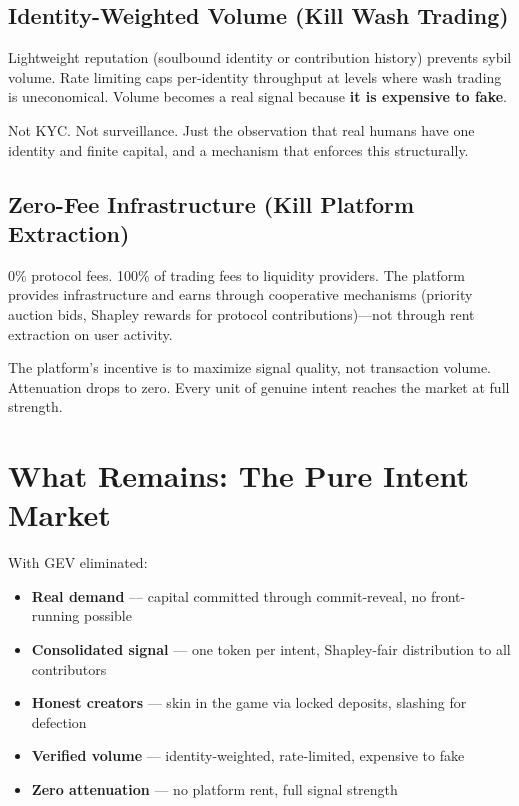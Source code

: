 \documentclass[9pt, letterpaper]{article}
\begin{document}
\subsection{Identity-Weighted Volume (Kill Wash Trading)}

Lightweight reputation (soulbound identity or contribution history) prevents sybil volume. Rate limiting caps per-identity throughput at levels where wash trading is uneconomical. Volume becomes a real signal because \textbf{it is expensive to fake}.

Not KYC. Not surveillance. Just the observation that real humans have one identity and finite capital, and a mechanism that enforces this structurally.

\subsection{Zero-Fee Infrastructure (Kill Platform Extraction)}

0\% protocol fees. 100\% of trading fees to liquidity providers. The platform provides infrastructure and earns through cooperative mechanisms (priority auction bids, Shapley rewards for protocol contributions)---not through rent extraction on user activity.

The platform's incentive is to maximize signal quality, not transaction volume. Attenuation drops to zero. Every unit of genuine intent reaches the market at full strength.


\section{What Remains: The Pure Intent Market}

With GEV eliminated:

\begin{itemize}
\item \textbf{Real demand} --- capital committed through commit-reveal, no front-running possible
\item \textbf{Consolidated signal} --- one token per intent, Shapley-fair distribution to all contributors
\item \textbf{Honest creators} --- skin in the game via locked deposits, slashing for defection
\item \textbf{Verified volume} --- identity-weighted, rate-limited, expensive to fake
\item \textbf{Zero attenuation} --- no platform rent, full signal strength
\end{itemize}
\end{document}
